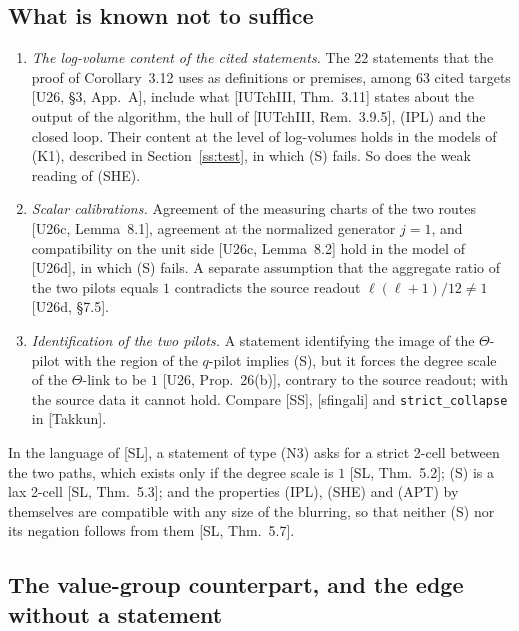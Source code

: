 \documentclass[11pt]{article}
\theoremstyle{definition}
\begin{document}
\subsection{What is known not to suffice}\label{ss:notsuffice}

\begin{enumerate}[label=(N\arabic*),leftmargin=*]
\item \emph{The log-volume content of the cited statements.}  The
22 statements that the proof of Corollary~3.12 uses as definitions
or premises, among 63 cited targets [U26, \S3, App.~A], include what
[IUTchIII, Thm.~3.11] states about the output of the algorithm, the
hull of [IUTchIII, Rem.~3.9.5], (IPL) and the closed loop.  Their
content at the level of log-volumes holds in the models of (K1),
described in Section~\ref{ss:test}, in which (S) fails.  So does the weak reading of (SHE).
\item \emph{Scalar calibrations.}  Agreement of the measuring charts
of the two routes [U26c, Lemma~8.1], agreement at the normalized
generator $j=1$, and compatibility on the unit side
[U26c, Lemma~8.2] hold in the model of [U26d], in which (S) fails.
A separate assumption that the aggregate ratio of the two pilots
equals $1$ contradicts the source readout $\ell(\ell+1)/12\ne1$
[U26d, \S7.5].
\item \emph{Identification of the two pilots.}  A statement
identifying the image of the $\Theta$-pilot with the region of the
$q$-pilot implies (S), but it forces the degree scale of the
$\Theta$-link to be $1$ [U26, Prop.~26(b)], contrary to the source
readout; with the source data it cannot hold.  Compare [SS],
[sfingali] and \texttt{strict\_collapse} in [Takkun].
\end{enumerate}
In the language of [SL], a statement of type (N3) asks for a strict
2-cell between the two paths, which exists only if the degree scale
is $1$ [SL, Thm.~5.2]; (S) is a lax 2-cell [SL, Thm.~5.3]; and the
properties (IPL), (SHE) and (APT) by themselves are compatible with
any size of the blurring, so that neither (S) nor its negation
follows from them [SL, Thm.~5.7].

\subsection{The value-group counterpart, and the edge without a statement}\label{ss:square}
\end{document}
